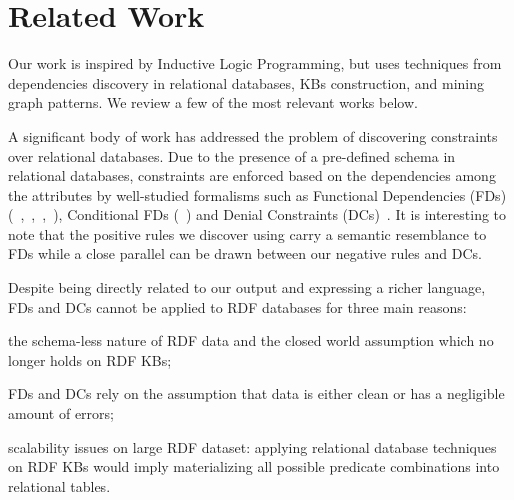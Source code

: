 \section{Related Work} \label{sec:krd_related}

Our work is inspired by Inductive Logic Programming, but uses techniques from dependencies discovery in relational databases, KBs construction, and mining graph patterns. 
We review a few of the most relevant works below.

A significant body of work has addressed the problem of discovering constraints over relational databases. 
Due to the presence of a pre-defined schema in relational databases, constraints are enforced based on the dependencies among the attributes by well-studied formalisms such as 
Functional Dependencies (FDs)(~\cite{abiteboul1995foundations},~\cite{abedjan2014dfd},~\cite{huhtala1999tane},~\cite{wyss2001fastfds}), Conditional FDs (~\cite{fan2011discovering}) 
and Denial Constraints (DCs)~\cite{bertossi2011database}. It is interesting to note that the positive rules we discover using \krd carry 
a semantic resemblance to FDs while 
a close parallel can be drawn between our negative rules and DCs.
%

Despite being directly related to our output and expressing a richer language, FDs and DCs cannot be applied to RDF databases for three main reasons:
\begin{inparaenum}[\itshape(i)]
	\item the schema-less nature of RDF data and the closed world assumption which no longer holds on RDF KBs;
	\item FDs and DCs rely on the assumption that data is either clean or has a negligible amount of errors;
	\item scalability issues on large RDF dataset: applying relational database techniques on RDF KBs would imply materializing all possible predicate combinations into relational tables.
\end{inparaenum}


